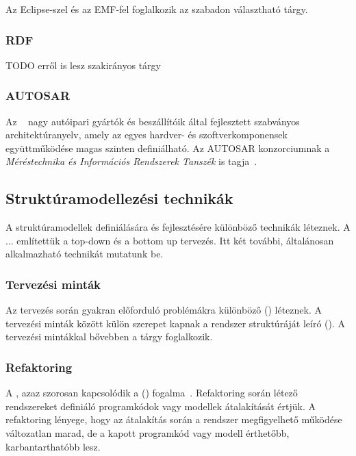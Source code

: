 Az Eclipse-szel és az EMF-fel foglalkozik az \eat szabadon választható tárgy.

\subsubsection{RDF}


TODO erről is lesz szakirányos tárgy

\subsubsection{AUTOSAR}

Az ~\cite{autosar} nagy autóipari gyártók és beszállítóik által fejlesztett szabványos architektúranyelv, amely az egyes hardver- és szoftverkomponensek együttműködése magas szinten definiálható. Az AUTOSAR konzorciumnak a \emph{Méréstechnika és Információs Rendszerek Tanszék} is tagja~\cite{autosar-attendees}.

\subsection{Struktúramodellezési technikák}

A struktúramodellek definiálására és fejlesztésére különböző technikák léteznek. A ... említettük a top-down és a bottom up tervezés. Itt két további, általánosan alkalmazható technikát mutatunk be.

\subsubsection{Tervezési minták}

Az  tervezés során gyakran előforduló problémákra különböző  () léteznek. A tervezési minták között külön szerepet kapnak a rendszer struktúráját leíró  (). A tervezési mintákkal bővebben a \sznikak tárgy foglalkozik.

\subsubsection{Refaktoring}

A , azaz  szorosan kapcsolódik a  () fogalma~\cite{fowler2012refactoring}. Refaktoring során létező rendszereket definiáló programkódok vagy modellek átalakítását értjük. A refaktoring lényege, hogy az átalakítás során a rendszer megfigyelhető működése változatlan marad, de a kapott programkód vagy modell érthetőbb, karbantarthatóbb lesz.

